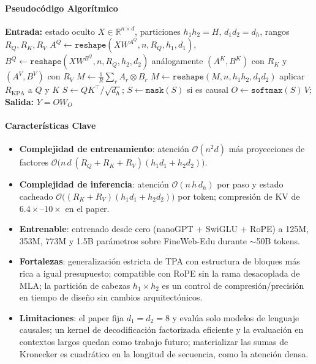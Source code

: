 \paragraph{Pseudocódigo Algorítmico}
\begin{algorithmic}[1]
\State \textbf{Entrada:} estado oculto $X\in\mathbb{R}^{n\times d}$, particiones $h_1 h_2 = H$, $d_1 d_2 = d_h$, rangos $R_Q, R_K, R_V$
\State $A^Q \gets \texttt{reshape}(X W^{A^Q}, n, R_Q, h_1, d_1)$, \quad $B^Q \gets \texttt{reshape}(X W^{B^Q}, n, R_Q, h_2, d_2)$
\State análogamente $(A^K,B^K)$ con $R_K$ y $(A^V,B^V)$ con $R_V$ 
    \State $M \gets \frac{1}{R}\sum_{r} A_r \otimes B_r$ 
    \State $M \gets \texttt{reshape}(M, n, h_1 h_2, d_1 d_2)$ 
\EndFor
\State aplicar $R_{\mathrm{KPA}}$ a $Q$ y $K$ 
\State $S \gets QK^{\top}/\sqrt{d_h}$; \quad $S \gets \texttt{mask}(S)$ si es causal
\State $O \gets \texttt{softmax}(S)\,V$; \quad \textbf{Salida:} $Y = O W_O$
\end{algorithmic}

\paragraph{Características Clave}
\begin{itemize}[leftmargin=*]
    \item \textbf{Complejidad de entrenamiento}: atención $\mathcal{O}(n^2 d)$ más proyecciones de factores $\mathcal{O}\big(n\,d\,(R_Q+R_K+R_V)(h_1d_1+h_2d_2)\big)$.
    \item \textbf{Complejidad de inferencia}: atención $\mathcal{O}(n\,h\,d_h)$ por paso y estado cacheado $\mathcal{O}\big((R_K+R_V)(h_1d_1+h_2d_2)\big)$ por token; compresión de KV de $6.4\times$--$10\times$ en el paper.
    \item \textbf{Entrenable}: entrenado desde cero (nanoGPT + SwiGLU + RoPE) a 125M, 353M, 773M y 1.5B parámetros sobre FineWeb-Edu durante $\sim$50B tokens.
    \item \textbf{Fortalezas}: generalización estricta de TPA con estructura de bloques más rica a igual presupuesto; compatible con RoPE sin la rama desacoplada de MLA; la partición de cabezas $h_1\times h_2$ es un control de compresión/precisión en tiempo de diseño sin cambios arquitectónicos.
    \item \textbf{Limitaciones}: el paper fija $d_1=d_2=8$ y evalúa solo modelos de lenguaje causales; un kernel de decodificación factorizada eficiente y la evaluación en contextos largos quedan como trabajo futuro; materializar las sumas de Kronecker es cuadrático en la longitud de secuencia, como la atención densa.
\end{itemize}


